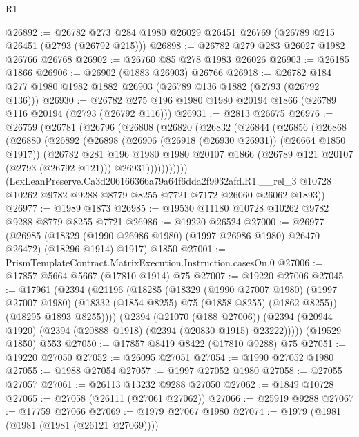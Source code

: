 \begin{lexlean}{R1}
\begin{coremodule}
@26892 := @26782 @273 @284 @1980 @26029 @26451 @26769 (@26789 @215 @26451 (@2793 (@26792 @215)))
@26898 := @26782 @279 @283 @26027 @1982 @26766 @26768
@26902 := @26760 @85 @278 @1983 @26026
@26903 := @26185 @1866
@26906 := @26902 (@1883 @26903) @26766
@26918 := @26782 @184 @277 @1980 @1982 @1882 @26903 (@26789 @136 @1882 (@2793 (@26792 @136)))
@26930 := @26782 @275 @196 @1980 @1980 @20194 @1866 (@26789 @116 @20194 (@2793 (@26792 @116)))
@26931 := @2813 @26675
@26976 := @26759
    (@26781
      (@26796
        (@26808
          (@26820
            (@26832
              (@26844
                (@26856
                  (@26868
                    (@26880
                      (@26892
                        (@26898
                          (@26906 (@26918 (@26930 @26931)) (@26664 @1850 @1917))
                          (@26782
                            @281
                            @196
                            @1980
                            @1980
                            @20107
                            @1866
                            (@26789 @121 @20107 (@2793 (@26792 @121)))
                            @26931)))))))))))
      (LexLeanPreserve.Ca3d206166366a79a64f6dda2f9932afd.R1.__rel_3
        @10728
        @10262
        @9782
        @9288
        @8779
        @8255
        @7721
        @7172
        @26060
        @26062
        @1893))
@26977 := @1989 @1873
@26985 := @19530 @11180 @10728 @10262 @9782 @9288 @8779 @8255 @7721
@26986 := @19220 @26524
@27000 := @26977
    (@26985 (@18329 (@1990 @26986 @1980) (@1997 @26986 @1980) @26470 @26472) (@18296 @1914) @1917)
    @1850
@27001 := PrismTemplateContract.MatrixExecution.Instruction.casesOn.{0}
@27006 := @17857 @5664 @5667 (@17810 @1914) @75
@27007 := @19220 @27006
@27045 := @17961
    (@2394
      (@21196
        (@18285
          (@18329
            (@1990 @27007 @1980)
            (@1997 @27007 @1980)
            (@18332 (@1854 @8255) @75 (@1858 @8255) (@1862 @8255))
            (@18295 @1893 @8255))))
      (@2394
        (@21070 (@188 @27006))
        (@2394 (@20944 @1920) (@2394 (@20888 @1918) (@2394 (@20830 @1915) @23222)))))
    (@19529 @1850)
    @553
@27050 := @17857 @8419 @8422 (@17810 @9288) @75
@27051 := @19220 @27050
@27052 := @26095 @27051
@27054 := @1990 @27052 @1980
@27055 := @1988 @27054
@27057 := @1997 @27052 @1980
@27058 := @27055 @27057
@27061 := @26113 @13232 @9288 @27050
@27062 := @1849 @10728
@27065 := @27058 (@26111 (@27061 @27062))
@27066 := @25919 @9288
@27067 := @17759 @27066
@27069 := @1979 @27067 @1980
@27074 := @1979 (@1981 (@1981 (@1981 (@26121 @27069))))

\end{coremodule}
\end{lexlean}
